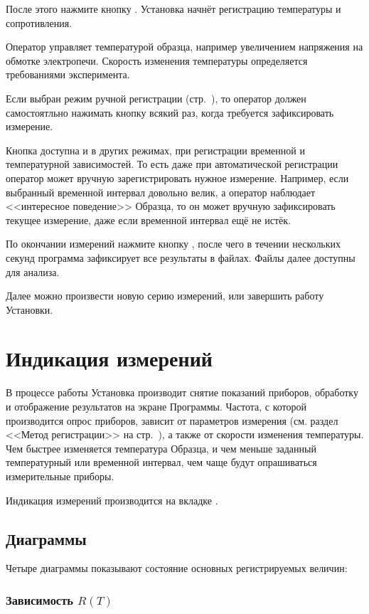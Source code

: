 \documentclass[12pt, a4paper, twocolumn]{report}
\begin{document}
После этого нажмите кнопку . Установка начнёт регистрацию температуры и сопротивления.

Оператор управляет температурой образца, например увеличением напряжения на обмотке электропечи. Скорость изменения температуры определяется требованиями эксперимента.

Если выбран режим ручной регистрации (стр.~\pageref{sec_reg_type_manual}), то оператор должен самостоятльно нажимать кнопку  всякий раз, когда требуется зафиксировать измерение.

Кнопка  доступна и в других режимах, при регистрации временной и температурной зависимостей. То есть даже при автоматической регистрации оператор может вручную зарегистрировать нужное измерение. Например, если выбранный временной интервал довольно велик, а оператор наблюдает <<интересное поведение>> Образца, то он может вручную зафиксировать текущее измерение, даже если временной интервал ещё не истёк.

По окончании измерений нажмите кнопку , после чего в течении нескольких секунд программа зафиксирует все результаты в файлах. Файлы далее доступны для анализа.

Далее можно произвести новую серию измерений, или завершить работу Установки.

\section{Индикация измерений}

В процессе работы Установка производит снятие показаний приборов, обработку и отображение результатов на экране Программы. Частота, с которой производится опрос приборов, зависит от параметров измерения (см. раздел <<Метод регистрации>> на стр.~\pageref{sec_reg_method}), а также от скорости изменения температуры. Чем быстрее изменяется температура Образца, и чем меньше заданный температурный или временной интервал, чем чаще будут опрашиваться измерительные приборы.

Индикация измерений производится на вкладке .

\subsection{Диаграммы}

Четыре диаграммы показывают состояние основных регистрируемых величин:

\subsubsection{Зависимость $R(T)$}
\end{document}
